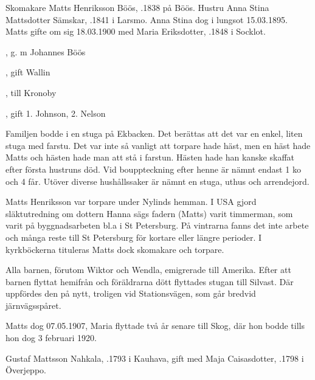 Skomakare Matts Henriksson Böös, .1838 på Böös. Hustru Anna Stina Mattsdotter Sämskar, .1841 i Larsmo. Anna Stina dog i lungsot 15.03.1895. Matts gifte om sig 18.03.1900 med Maria Eriksdotter, .1848 i Socklot.
\begin{jhchildren}
  \item {}
  \item {}, g. m Johannes Böös
  \item {}, gift Wallin
  \item {}
  \item {}, till Kronoby
  \item {}
  \item {}, gift 1. Johnson, 2. Nelson
\end{jhchildren}
Familjen bodde i en stuga på Ekbacken. Det berättas att det var en enkel, liten stuga med farstu. Det var inte så vanligt att torpare hade häst, men en häst hade Matts och hästen hade man att stå i farstun. Hästen hade han kanske skaffat efter första hustruns död. Vid bouppteckning efter henne är nämnt endast 1 ko och 4 får. Utöver diverse hushållssaker är nämnt en stuga, uthus och arrendejord.

Matts Henriksson var torpare under Nylinds hemman. I USA gjord släktutredning om dottern Hanna sägs fadern (Matts) varit timmerman, som varit på byggnadsarbeten bl.a i St Petersburg. På vintrarna fanns det inte arbete och många reste till St Petersburg för kortare eller längre perioder. I kyrkböckerna tituleras Matts dock skomakare och torpare.

Alla barnen, förutom Wiktor och Wendla, emigrerade till Amerika. Efter att barnen flyttat hemifrån och föräldrarna dött flyttades stugan till Silvast. Där uppfördes den på nytt, troligen vid Stationsvägen, som går bredvid järnvägsspåret.

Matts dog 07.05.1907, Maria flyttade två år senare till Skog, där hon bodde tills hon dog 3 februari 1920.


Gustaf Mattsson Nahkala, .1793 i Kauhava, gift med Maja Caisasdotter, .1798 i Överjeppo.

